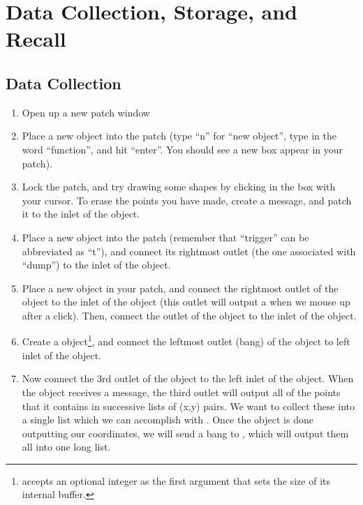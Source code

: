 \section{Data Collection, Storage, and Recall}\label{storage and recall}

\subsection{Data Collection}
\begin{enumerate}
\item Open up a new patch window
\item Place a new  object into the patch (type ``n'' for ``new object'', type in the word ``function'', and hit ``enter''.  You should see a new box appear in your patch).
\item Lock the patch, and try drawing some shapes by clicking in the box with your cursor.  To erase the points you have made, create a  message, and patch it to the inlet of the  object.
\item Place a new  object into the patch (remember that ``trigger'' can be abbreviated as ``t''), and connect its rightmost outlet (the one associated with ``dump'') to the inlet of the  object.
\item Place a new  object in your patch, and connect the rightmost outlet of the  object to the inlet of the  object (this outlet will output a  when we mouse up after a click).  Then, connect the outlet of the  object to the inlet of the  object.
\item Create a  object\footnote[1]{ accepts an optional integer as the first argument that sets the size of its internal buffer.}, and connect the leftmost outlet (bang) of the  object to left inlet of the  object.
\item Now connect the 3rd outlet of the  object to the left inlet of the  object.  When the  object receives a  message, the third outlet will output all of the points that it contains in successive lists of (x,y) pairs.  We want to collect these into a single list which we can accomplish with .  Once the  object is done outputting our coordinates, we will send a bang to , which will output them all into one long list.  
\end{enumerate}

